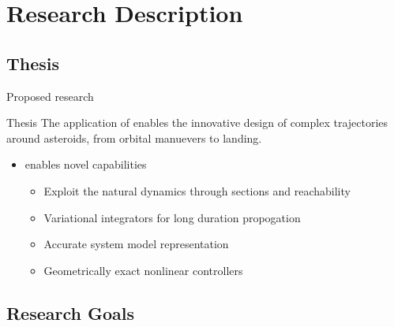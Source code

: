 
\section*{Research Description}
\subsection*{Thesis}

\begin{frame}[t]{Proposed research}
    \begin{block}{Thesis}
        The application of  enables the innovative design of complex trajectories around asteroids, from orbital manuevers to landing.
    \end{block}
    \begin{itemize}
        \item {} enables novel capabilities
        \begin{itemize}     
            \item Exploit the natural dynamics through \Poincare sections and reachability
            \item Variational integrators for long duration propogation
            \item Accurate system model representation
            \item Geometrically exact nonlinear controllers
        \end{itemize}
    \end{itemize}

\end{frame}

\subsection*{Research Goals}

